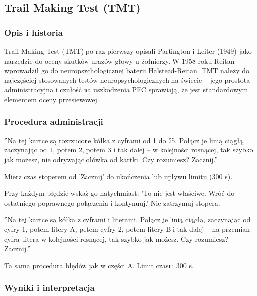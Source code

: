 \documentclass[11pt,a4paper]{article}
\begin{document}
\subsection{Trail Making Test (TMT)}

\subsubsection{Opis i historia}

Trail Making Test (TMT) po raz pierwszy opisali Partington i Leiter (1949) jako narzędzie do oceny skutków urazów głowy u żołnierzy. W 1958 roku Reitan wprowadził go do neuropsychologicznej baterii Halstead-Reitan. TMT należy do najczęściej stosowanych testów neuropsychologicznych na świecie -- jego prostota administracyjna i czułość na uszkodzenia PFC sprawiają, że jest standardowym elementem oceny przesiewowej.

\subsubsection{Procedura administracji}

\begin{tcolorbox}[instructionbox, title={Instrukcja werbalna -- TMT część A}]
''Na tej kartce są rozrzucone kółka z cyframi od 1 do 25. Połącz je linią ciągłą, zaczynając od 1, potem 2, potem 3 i tak dalej -- w kolejności rosnącej, tak szybko jak możesz, nie odrywając ołówka od kartki. Czy rozumiesz? Zacznij.''

Mierz czas stoperem od 'Zacznij' do ukończenia lub upływu limitu (300 s).

Przy każdym błędzie wskaż go natychmiast: 'To nie jest właściwe. Wróć do ostatniego poprawnego połączenia i kontynuuj.' Nie zatrzymuj stopera.
\end{tcolorbox}

\begin{tcolorbox}[instructionbox, title={Instrukcja werbalna -- TMT część B}]
''Na tej kartce są kółka z cyframi i literami. Połącz je linią ciągłą, zaczynając od cyfry 1, potem litery A, potem cyfry 2, potem litery B i tak dalej -- na przemian cyfra--litera w kolejności rosnącej, tak szybko jak możesz. Czy rozumiesz? Zacznij.''

Ta sama procedura błędów jak w części A. Limit czasu: 300 s.
\end{tcolorbox}

\subsubsection{Wyniki i interpretacja}
\end{document}
